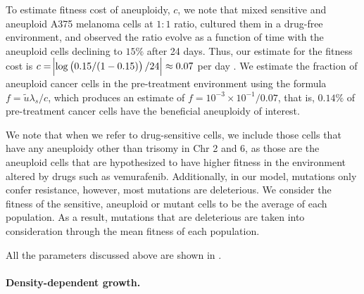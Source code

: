 \documentclass[12pt]{extarticle}
\begin{document}
To estimate fitness cost of aneuploidy, $c$, we note that \citet{lukow2021chromosomal} mixed sensitive and aneuploid A375 melanoma cells at $1:1$ ratio, cultured them in a drug-free environment, and observed the ratio evolve as a function of time with the aneuploid cells declining to $15\%$ after 24 days. Thus, our estimate for the fitness cost is $c=\abs{\log\left(0.15/(1-0.15)\right)/24}\approx0.07$ per day \citep{chevin2011measuring}.
We estimate the fraction of aneuploid cancer cells in the pre-treatment environment using the formula $f=\tilde{u}\lambda_s / c$, which produces an estimate of $f=10^{-3}\times10^{-1}/0.07$, that is, $0.14\%$ of pre-treatment cancer cells have the beneficial aneuploidy of interest. %

We note that when we refer to drug-sensitive cells, we include those cells that have any aneuploidy other than trisomy in Chr 2 and 6, as those are the aneuploid cells that are hypothesized to have higher fitness in the environment altered by drugs such as vemurafenib. Additionally, in our model, mutations only confer resistance, however, most mutations are deleterious. We consider the fitness of the sensitive, aneuploid or mutant cells to be the average of each population. As a result, mutations that are deleterious are taken into consideration through the mean fitness of each population. %

All the parameters discussed above are shown in .



\paragraph{Density-dependent growth.}
\end{document}
